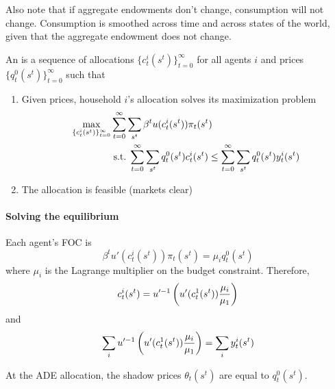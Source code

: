 \documentclass[10pt]{article}
\begin{document}
Also note that if aggregate endowments don't change, consumption will not change. Consumption is smoothed across time and across states of the world, given that the aggregate endowment does not change.

\begin{definition}
	An  is a sequence of allocations $\{c_t^i(s^t)\}_{t=0}^\infty$ for all agents $i$ and prices $\{q_t^0(s^t)\}_{t=0}^\infty$ such that
	\begin{enumerate}
		\item Given prices, household $i$'s allocation solves its maximization problem
		\begin{align*}
			\max_{\{c_t^i(s^t)\}_{t=0}^\infty}& \sum_{t=0}^\infty \sum_{s^t} \beta^t u(c_t^i(s^t))\pi_t(s^t)  \\
			& \;\text{s.t.}\; \sum_{t=0}^\infty \sum_{s^t} q_t^0(s^t)c_t^i(s^t) \le \sum_{t=0}^\infty \sum_{s^t} q_t^0(s^t)y_t^i(s^t)
		\end{align*}
		\item The allocation is feasible (markets clear)
	\end{enumerate}
\end{definition}

\paragraph{Solving the equilibrium} Each agent's FOC is
\[
\beta^t u'(c_t^i(s^t))\pi_t(s^t) = \mu_i q_t^0(s^t)
\]
where $\mu_i$ is the Lagrange multiplier on the budget constraint. Therefore,
\[
c_t^i(s^t) = u'^{-1}\left( u'(c_t^1(s^t))\frac{\mu_i}{\mu_1} \right)
\]
and
\[
\sum_i u'^{-1}\left( u'(c_t^1(s^t))\frac{\mu_i}{\mu_1} \right) = \sum_i y_t^i(s^t)
\]
\begin{remark}
	At the ADE allocation, the shadow prices $\theta_t(s^t)$ are equal to $q_t^0(s^t)$.
\end{remark}
\end{document}
